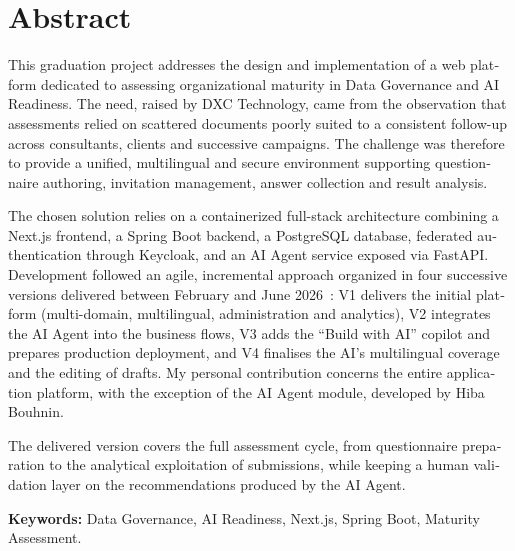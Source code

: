 \documentclass[12pt,a4paper]{report}
\begin{document}
\chapter*{Abstract}
\begin{english}
This graduation project addresses the design and implementation of a web platform dedicated to assessing organizational maturity in Data Governance and AI Readiness. The need, raised by DXC Technology, came from the observation that assessments relied on scattered documents poorly suited to a consistent follow-up across consultants, clients and successive campaigns. The challenge was therefore to provide a unified, multilingual and secure environment supporting questionnaire authoring, invitation management, answer collection and result analysis.

The chosen solution relies on a containerized full-stack architecture combining a Next.js frontend, a Spring Boot backend, a PostgreSQL database, federated authentication through Keycloak, and an AI Agent service exposed via FastAPI. Development followed an agile, incremental approach organized in four successive versions delivered between February and June 2026~: V1 delivers the initial platform (multi-domain, multilingual, administration and analytics), V2 integrates the AI Agent into the business flows, V3 adds the “Build with AI” copilot and prepares production deployment, and V4 finalises the AI's multilingual coverage and the editing of drafts. My personal contribution concerns the entire application platform, with the exception of the AI Agent module, developed by Hiba Bouhnin.

The delivered version covers the full assessment cycle, from questionnaire preparation to the analytical exploitation of submissions, while keeping a human validation layer on the recommendations produced by the AI Agent.
\end{english}

\textbf{Keywords:} Data Governance, AI Readiness, Next.js, Spring Boot, Maturity Assessment.

\tableofcontents
\listoffigures
\listoftables
\end{document}
